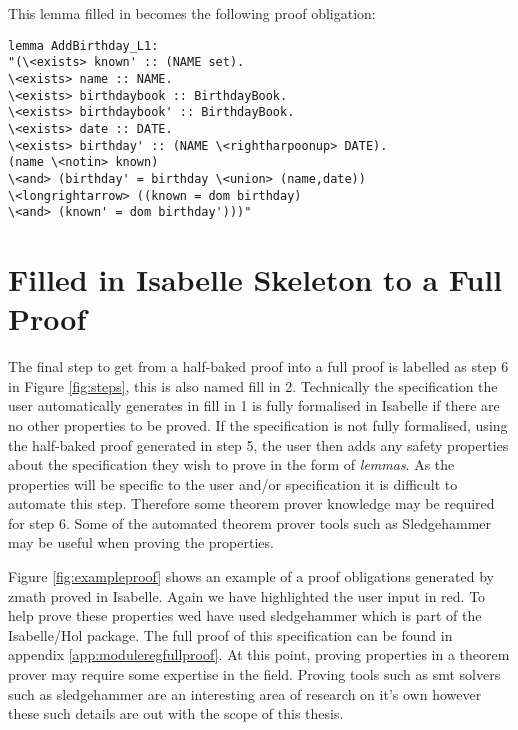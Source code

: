 This lemma filled in becomes the following proof obligation:

\begin{verbatim}
lemma AddBirthday_L1:
"(\<exists> known' :: (NAME set).
\<exists> name :: NAME.
\<exists> birthdaybook :: BirthdayBook.
\<exists> birthdaybook' :: BirthdayBook.
\<exists> date :: DATE.
\<exists> birthday' :: (NAME \<rightharpoonup> DATE).
(name \<notin> known)
\<and> (birthday' = birthday \<union> (name,date))
\<longrightarrow> ((known = dom birthday)
\<and> (known' = dom birthday')))"
\end{verbatim}

\section{Filled in Isabelle Skeleton to a Full Proof}
\label{sec:isa2ful}

The final step to get from a half-baked proof into a full proof is labelled as step 6 in Figure \ref{fig:steps}, this is also named fill in 2. Technically the specification the user automatically generates in fill in 1 is fully formalised in Isabelle if there are no other properties to be proved. If the specification is not fully formalised, using the half-baked proof generated in step 5, the user then adds any safety properties about the specification they wish to prove in the form of \emph{lemmas}. As the properties will be specific to the user and/or specification it is difficult to automate this step. Therefore some theorem prover knowledge may be required for step 6. Some of the automated theorem prover tools such as Sledgehammer \cite{sledgehammer} may be useful when proving the properties.

Figure \ref{fig:exampleproof} shows an example of a proof obligations generated by \gls{zmath} proved in Isabelle. Again we have highlighted the user input in {\color{red}red}. To help prove these properties wed have used sledgehammer \cite{sledgehammer} which is part of the Isabelle/Hol package. The full proof of this specification can be found in appendix \ref{app:moduleregfullproof}. At this point, proving properties in a theorem prover may require some expertise in the field. Proving tools such as \gls{smt} solvers \cite{DeMoura:2011:SMT:1995376.1995394} such as sledgehammer are an interesting area of research on it's own however these such details are out with the scope of this thesis.

